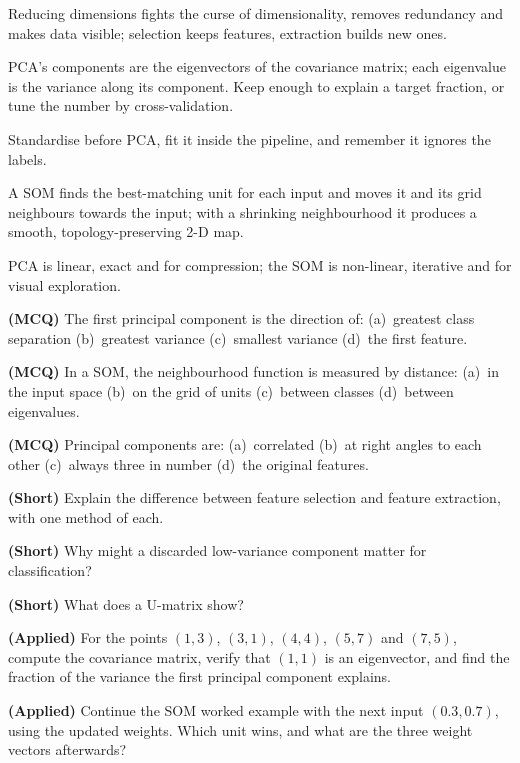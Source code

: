 \begin{chaptersummary}
\begin{tight}
  \item Reducing dimensions fights the curse of dimensionality, removes redundancy
        and makes data visible; selection keeps features, extraction builds new
        ones.
  \item PCA's components are the eigenvectors of the covariance matrix; each
        eigenvalue is the variance along its component. Keep enough to explain a
        target fraction, or tune the number by cross-validation.
  \item Standardise before PCA, fit it inside the pipeline, and remember it ignores
        the labels.
  \item A SOM finds the best-matching unit for each input and moves it and its grid
        neighbours towards the input; with a shrinking neighbourhood it produces a
        smooth, topology-preserving 2-D map.
  \item PCA is linear, exact and for compression; the SOM is non-linear, iterative
        and for visual exploration.
\end{tight}
\end{chaptersummary}

\begin{reviewq}
  \item \textbf{(MCQ)} The first principal component is the direction of:
        (a)~greatest class separation (b)~greatest variance (c)~smallest variance
        (d)~the first feature.
  \item \textbf{(MCQ)} In a SOM, the neighbourhood function is measured by distance:
        (a)~in the input space (b)~on the grid of units (c)~between classes
        (d)~between eigenvalues.
  \item \textbf{(MCQ)} Principal components are: (a)~correlated (b)~at right angles
        to each other (c)~always three in number (d)~the original features.
  \item \textbf{(Short)} Explain the difference between feature selection and feature
        extraction, with one method of each.
  \item \textbf{(Short)} Why might a discarded low-variance component matter for
        classification?
  \item \textbf{(Short)} What does a U-matrix show?
  \item \textbf{(Applied)} For the points $(1, 3)$, $(3, 1)$, $(4, 4)$, $(5, 7)$ and
        $(7, 5)$, compute the covariance matrix, verify that $(1, 1)$ is an
        eigenvector, and find the fraction of the variance the first principal
        component explains.
  \item \textbf{(Applied)} Continue the SOM worked example with the next input
        $(0.3, 0.7)$, using the updated weights. Which unit wins, and what are the
        three weight vectors afterwards?
\end{reviewq}

